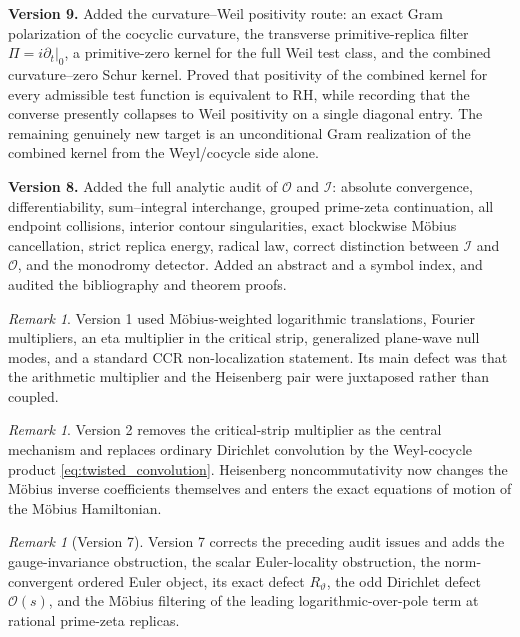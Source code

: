 \documentclass[11pt]{amsart}
\numberwithin{equation}{section}
\theoremstyle{plain}
\theoremstyle{definition}
\theoremstyle{remark}
\newtheorem{remark}[theorem]{Remark}
\begin{document}
\noindent\textbf{Version 9.}
Added the curvature--Weil positivity route: an exact Gram polarization of the
cocyclic curvature, the transverse primitive-replica filter
\(\Pi=i\partial_t|_{0}\), a primitive-zero kernel for the full Weil test
class, and the combined curvature--zero Schur kernel.  Proved that positivity
of the combined kernel for every admissible test function is equivalent to RH,
while recording that the converse presently collapses to Weil positivity on a
single diagonal entry.  The remaining genuinely new target is an
unconditional Gram realization of the combined kernel from the Weyl/cocycle
side alone.


\noindent\textbf{Version 8.}
Added the full analytic audit of \(\mathcal O\) and \(\mathcal I\): absolute
convergence, differentiability, sum--integral interchange, grouped
prime-zeta continuation, all endpoint collisions, interior contour
singularities, exact blockwise M\"obius cancellation, strict replica energy,
radical law, correct distinction between \(\mathcal I\) and \(\mathcal O\),
and the monodromy detector.  Added an abstract and a symbol index, and audited
the bibliography and theorem proofs.


\begin{remark}
\label{rem:history_v1}
Version 1 used M\"obius-weighted logarithmic translations, Fourier
multipliers, an eta multiplier in the critical strip, generalized plane-wave
null modes, and a standard CCR non-localization statement.  Its main defect
was that the arithmetic multiplier and the Heisenberg pair were juxtaposed
rather than coupled.
\end{remark}

\begin{remark}
\label{rem:history_v2}
Version 2 removes the critical-strip multiplier as the central mechanism and
replaces ordinary Dirichlet convolution by the Weyl-cocycle product
\eqref{eq:twisted_convolution}.  Heisenberg noncommutativity now changes the
M\"obius inverse coefficients themselves and enters the exact equations of
motion of the M\"obius Hamiltonian.
\end{remark}




\begin{remark}[Version 7]
\label{rem:history_v7}
Version 7 corrects the preceding audit issues and adds the gauge-invariance
obstruction, the scalar Euler-locality obstruction, the norm-convergent
ordered Euler object, its exact defect \(R_\vartheta\), the odd Dirichlet
defect \(\mathcal O(s)\), and the M\"obius filtering of the leading
logarithmic-over-pole term at rational prime-zeta replicas.
\end{remark}
\end{document}
